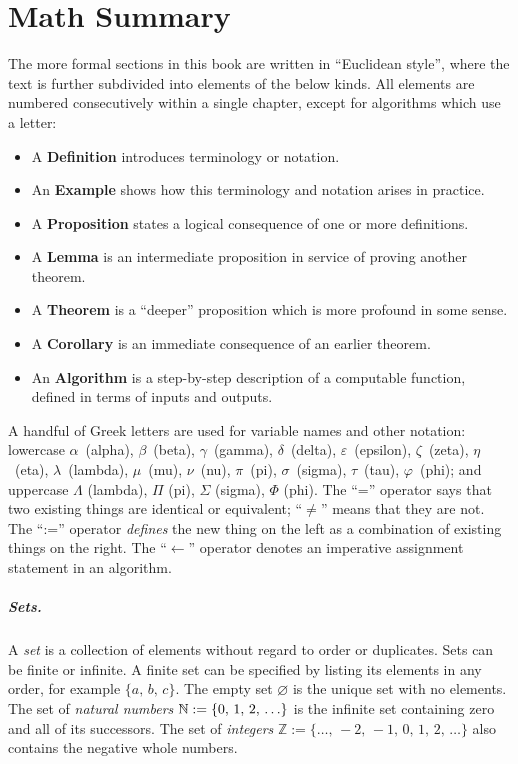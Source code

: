 \documentclass[../generics]{subfiles}
\begin{document}
\chapter{Math Summary}\label{math summary}

The more formal sections in this book are written in ``Euclidean style'', where the text is further subdivided into elements of the below kinds. All elements are numbered consecutively within a single chapter, except for algorithms which use a letter:
\begin{itemize}
\item A \textbf{Definition} introduces terminology or notation.
\item An \textbf{Example} shows how this terminology and notation arises in practice.
\item A \textbf{Proposition} states a logical consequence of one or more definitions.
\item A \textbf{Lemma} is an  intermediate proposition in service of proving another theorem.
\item A \textbf{Theorem} is a ``deeper'' proposition which is more profound in some sense.
\item A \textbf{Corollary} is an immediate consequence of an earlier theorem.
\item An \textbf{Algorithm} is a step-by-step description of a computable function, defined in terms of inputs and outputs.
\end{itemize}

A handful of Greek letters are used for variable names and other notation: lowercase $\alpha$~(alpha), $\beta$~(beta), $\gamma$~(gamma), $\delta$~(delta), $\varepsilon$~(epsilon), $\zeta$~(zeta), $\eta$~(eta), $\lambda$~(lambda), $\mu$~(mu), $\nu$~(nu), $\pi$~(pi), $\sigma$~(sigma), $\tau$~(tau), $\varphi$~(phi); and uppercase $\Lambda$ (lambda), $\Pi$ (pi), $\Sigma$ (sigma), $\Phi$ (phi). The ``='' operator says that two existing things are identical or equivalent; ``$\neq$'' means that they are not. The ``:='' operator \emph{defines} the new thing on the left as a combination of existing things on the right. The ``$\leftarrow$'' operator denotes an imperative assignment statement in an algorithm.

\paragraph{Sets.}
A \emph{set} is a collection of elements without regard to order or duplicates. Sets can be finite or infinite. A finite set can be specified by listing its elements in any order, for example $\{a,\,b,\,c\}$. The empty set \index{$\varnothing$}$\varnothing$ is the unique set with no elements. The set of \emph{natural numbers} \index{$\NN$}$\mathbb{N}:=\{0,\,1,\,2,\,\ldots\}$ is the infinite set containing zero and all of its successors. The set of \emph{integers} $\mathbb{Z}:=\{\ldots,\,-2,\,-1,\,0,\,1,\,2,\,\ldots\}$ also contains the negative whole numbers.
\end{document}
